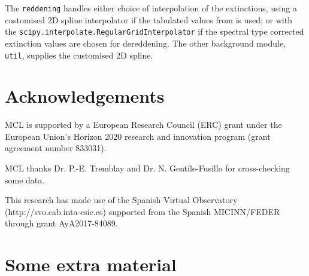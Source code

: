 \documentclass[fleqn,usenatbib]{rasti}
\begin{document}
The \texttt{reddening} handles either choice of interpolation of the
extinctions, using a customised 2D spline interpolator if the tabulated values
from \citet{2011ApJ...737..103S} is used; or with the
\verb+scipy.interpolate.RegularGridInterpolator+ if the spectral type corrected
extinction values are chosen for dereddening. The other background module,
\texttt{util}, supplies the customised 2D spline.


\section*{Acknowledgements}
MCL is supported by a European Research Council (ERC) grant under the European
Union’s Horizon 2020 research and innovation program (grant agreement number
833031).

MCL thanks Dr. P.-E. Tremblay and Dr. N. Gentile-Fusillo for cross-checking
some data.

This research has made use of the Spanish Virtual Observatory
(http://svo.cab.inta-csic.es) supported from the Spanish MICINN/FEDER through
grant AyA2017-84089.











\appendix

\section{Some extra material}



\bsp	%
\label{lastpage}
\end{document}
